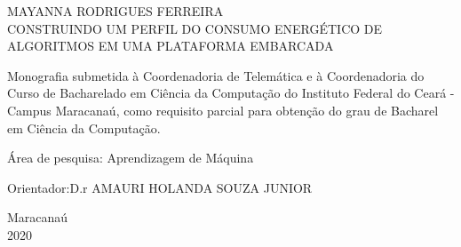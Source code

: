 \begin{titlepage}
\vfill
\begin{center}

    {\large MAYANNA RODRIGUES FERREIRA\\}
    \vspace{2cm}
    {\Large \textsc{CONSTRUINDO UM PERFIL DO CONSUMO ENERGÉTICO DE ALGORITMOS EM UMA PLATAFORMA EMBARCADA}\\}
    \vspace{1cm}
    \hspace{.45\linewidth}
    \begin{minipage}{.50\linewidth}

            Monografia submetida à Coordenadoria de Telemática e à Coordenadoria do Curso de Bacharelado 
            em Ciência da Computação do Instituto Federal do Ceará - Campus Maracanaú, como requisito 
            parcial para obtenção do grau de Bacharel em Ciência da Computação.

            \vspace{0.5 cm}

            Área de pesquisa: Aprendizagem de Máquina

            \vspace{0.5 cm}

            Orientador:D.r AMAURI HOLANDA SOUZA JUNIOR
    
    \end{minipage}

    \vspace{2cm}
    \vfill
    {\large Maracanaú\\ 2020}
\end{center}

\end{titlepage}